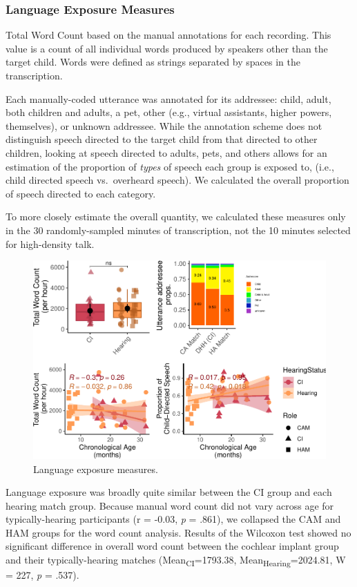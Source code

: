 \documentclass[
  man,floatsintext]{apa6}
\begin{document}
\subsubsection{Language Exposure Measures}\label{language-exposure-measures}

Total Word Count based on the manual annotations for each recording. This value is a count of all individual words produced by speakers other than the target child. Words were defined as strings separated by spaces in the transcription.

Each manually-coded utterance was annotated for its addressee: child, adult, both children and adults, a pet, other (e.g., virtual assistants, higher powers, themselves), or unknown addressee. While the annotation scheme does not distinguish speech directed to the target child from that directed to other children, looking at speech directed to adults, pets, and others allows for an estimation of the proportion of \emph{types} of speech each group is exposed to, (i.e., child directed speech vs.~overheard speech). We calculated the overall proportion of speech directed to each category.

To more closely estimate the overall quantity, we calculated these measures only in the 30 randomly-sampled minutes of transcription, not the 10 minutes selected for high-density talk.

\begin{figure}
\centering
\includegraphics{DHH_Input_files/figure-latex/langex-plot-1.pdf}
\caption{\label{fig:langex-plot}Language exposure measures.}
\end{figure}

Language exposure was broadly quite similar between the CI group and each hearing match group. Because manual word count did not vary across age for typically-hearing participants (r = -0.03, \emph{p} = .861), we collapsed the CAM and HAM groups for the word count analysis. Results of the Wilcoxon test showed no significant difference in overall word count between the cochlear implant group and their typically-hearing matches (Mean\textsubscript{CI}=1793.38, Mean\textsubscript{Hearing}=2024.81, W = 227, \emph{p} = .537).
\end{document}
